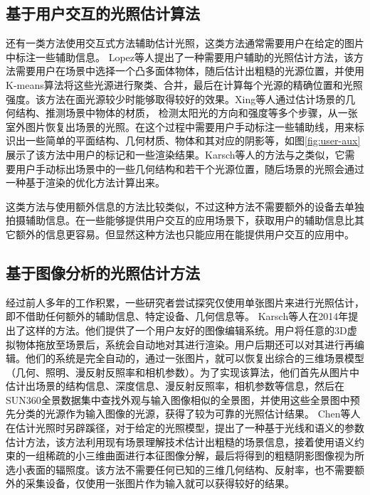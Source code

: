 \subsection{基于用户交互的光照估计算法}
还有一类方法使用交互式方法辅助估计光照，这类方法通常需要用户在给定的图片中标注一些辅助信息。
Lopez等人\cite{lopez2010compositing}提出了一种需要用户辅助的光照估计方法，该方法需要用户在场景中选择一个凸多面体物体，随后估计出粗糙的光源位置，并使用K-means算法将这些光源进行聚类、合并，最后在计算每个光源的精确位置和光照强度。该方法在面光源较少时能够取得较好的效果。Xing等人\cite{xing2013lighting}通过估计场景的几何结构、推测场景中物体的材质， 检测太阳光的方向和强度等多个步骤，从一张室外图片恢复出场景的光照。在这个过程中需要用户手动标注一些辅助线，用来标识出一些简单的平面结构、几何材质、物体和其对应的阴影等，如图\ref{fig:user-aux}展示了该方法中用户的标记和一些渲染结果。Karsch等人\cite{karsch2011rendering}的方法与之类似，它需要用户手动标出场景中的一些几何结构和若干个光源位置，随后场景的光照会通过一种基于渲染的优化方法计算出来。


这类方法与使用额外信息的方法比较类似，不过这种方法不需要额外的设备去单独拍摄辅助信息。在一些能够提供用户交互的应用场景下，获取用户的辅助信息比其它额外的信息更容易。但显然这种方法也只能应用在能提供用户交互的应用中。
\subsection{基于图像分析的光照估计方法}
经过前人多年的工作积累，一些研究者尝试探究仅使用单张图片来进行光照估计，即不借助任何额外的辅助信息、特定设备、几何信息等。
Karsch等人\cite{karsch2014automatic}在2014年提出了这样的方法。他们提供了一个用户友好的图像编辑系统。用户将任意的3D虚拟物体拖放至场景后，系统会自动地对其进行渲染。用户后期还可以对其进行再编辑。他们的系统是完全自动的，通过一张图片，就可以恢复出综合的三维场景模型（几何、照明、漫反射反照率和相机参数）。为了实现该算法，他们首先从图片中估计出场景的结构信息、深度信息、漫反射反照率，相机参数等信息，然后在SUN360全景数据集\cite{xiao2012recognizing}中查找外观与输入图像相似的全景图，并使用这些全景图中预先分类的光源作为输入图像的光源，获得了较为可靠的光照估计结果。
Chen等人\cite{chen2014lighting}在估计光照时另辟蹊径，对于给定的光照模型，提出了一种基于光线和语义的参数估计方法，该方法利用现有场景理解技术估计出粗糙的场景信息，接着使用语义约束的一组稀疏的小三维曲面进行本征图像分解，最后将得到的粗糙阴影图像视为所选小表面的辐照度。该方法不需要任何已知的三维几何结构、反射率，也不需要额外的采集设备，仅使用一张图片作为输入就可以获得较好的结果。

